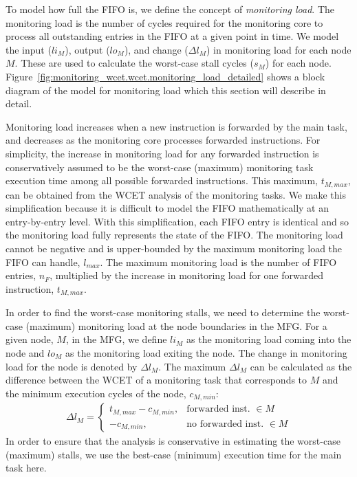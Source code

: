 To model how full the FIFO is, we define the concept of \emph{monitoring load}.
The monitoring load is the number of cycles required for the monitoring core to
process all outstanding entries in the FIFO at a given point in time. We model
the input ($li_M$), output ($lo_M$), and change ($\Delta l_M$) in monitoring
load for each node $M$. These are used to
calculate the worst-case stall cycles ($s_M$) for each node.
Figure~\ref{fig:monitoring_wcet.wcet.monitoring_load_detailed} shows a block
diagram of the model for monitoring load which this section will describe in
detail. 

Monitoring load increases when a new instruction is forwarded by the main task,
and decreases as the monitoring core processes forwarded instructions. For
simplicity, the increase in monitoring load for any forwarded instruction is
conservatively assumed to be the worst-case (maximum) monitoring task execution
time among all possible forwarded instructions. This maximum, $t_{M, max}$, can
be obtained from the WCET analysis of the monitoring tasks.  We make this
simplification because it is difficult to model the FIFO mathematically at an
entry-by-entry level. With this simplification, each FIFO entry is identical
and so the monitoring load fully represents the state of the FIFO.  The
monitoring load cannot be negative and is upper-bounded by the maximum
monitoring load the FIFO can handle, $l_{max}$. The maximum monitoring load is
the number of FIFO entries, $n_F$, multiplied by the increase in monitoring
load for one forwarded instruction, $t_{M, max}$.

In order to find the worst-case monitoring stalls, we need to determine the
worst-case (maximum) monitoring load at the node boundaries in the MFG. For a
given node, $M$, in the MFG, we define $li_{M}$ as the monitoring load coming
into the node and $lo_{M}$ as the monitoring load exiting the node. The change
in monitoring load for the node is denoted by $\Delta l_{M}$. The maximum
$\Delta l_{M}$ can be calculated as the difference between the WCET of a
monitoring task that corresponds to $M$ and the minimum execution cycles of the
node, $c_{M,min}$: 
\begin{align*}
\Delta l_{M} = 
	\begin{cases}
	t_{M,max} - c_{M,min}, &\text{forwarded inst. } \in M \\
	- c_{M,min}, &\text{no forwarded inst. } \in M
	\end{cases}
\end{align*}
In order to ensure that the analysis is conservative in estimating the
worst-case (maximum) stalls, we use the best-case (minimum) execution time for
the main task here. 

